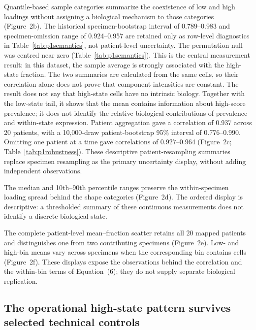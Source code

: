 \documentclass[10pt,a4paper]{article}
\begin{document}
Quantile-based sample categories summarize the coexistence of low and high loadings without assigning a biological mechanism to those categories (Figure~2b). The historical specimen-bootstrap interval of 0.789--0.983 and specimen-omission range of 0.924--0.957 are retained only as row-level diagnostics in Table~\ref{tab:p1semantics}, not patient-level uncertainty. The permutation null was centred near zero (Table~\ref{tab:p1semantics}). This is the central measurement result: in this dataset, the sample average is strongly associated with the high-state fraction. The two summaries are calculated from the same cells, so their correlation alone does not prove that component intensities are constant. The result does not say that high-state cells have no intrinsic biology. Together with the low-state tail, it shows that the mean contains information about high-score prevalence; it does not identify the relative biological contributions of prevalence and within-state expression. Patient aggregation gave a correlation of 0.937 across 20 patients, with a 10,000-draw patient-bootstrap 95\% interval of 0.776--0.990. Omitting one patient at a time gave correlations of 0.927--0.964 (Figure~2c; Table~\ref{tab:p1robustness}). These descriptive patient-resampling summaries replace specimen resampling as the primary uncertainty display, without adding independent observations.

The median and 10th--90th percentile ranges preserve the within-specimen loading spread behind the shape categories (Figure~2d). The ordered display is descriptive: a thresholded summary of these continuous measurements does not identify a discrete biological state.

The complete patient-level mean--fraction scatter retains all 20 mapped patients and distinguishes one from two contributing specimens (Figure~2e). Low- and high-bin means vary across specimens when the corresponding bin contains cells (Figure~2f). These displays expose the observations behind the correlation and the within-bin terms of Equation~(6); they do not supply separate biological replication.

\subsection{The operational high-state pattern survives selected technical controls}
\end{document}
